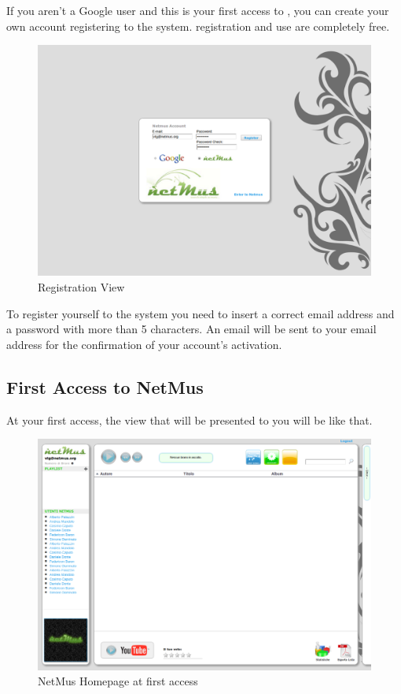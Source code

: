 If you aren't a Google user and this is your first access to , you can
create your own account registering to the system.
 registration and use are completely free. \\

\begin{figure}[htbp]
  \centering
  \includegraphics[width=15cm]{img/MU/registration.png}
\caption{Registration View}
\end{figure}


To register yourself to the system you need to insert a correct email address
and a password with more than 5 characters. An email will be sent to your email
address for the confirmation of your account's activation.

\subsection{First Access to NetMus}

At your first access, the view that will be presented to you will be like that.

\begin{figure}[htbp]
  \centering
  \includegraphics[width=15cm]{img/MU/profile_blank.png}
\caption{NetMus Homepage at first access}
\end{figure}

